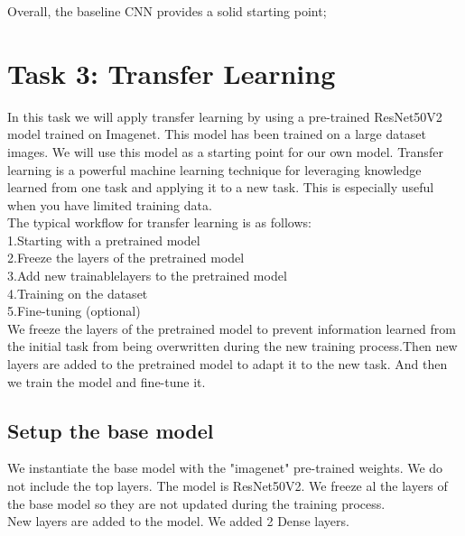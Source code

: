 \documentclass[conference]{IEEEtran}
\begin{document}
Overall, the baseline CNN provides a solid starting point;




\section{Task 3: Transfer Learning} \label{sec:task_3}
In this task we will apply transfer learning by using a pre-trained ResNet50V2 model trained on Imagenet. This model has been trained on a large dataset images. We will use this model as a starting point for our own model. Transfer learning is a powerful machine learning technique for leveraging knowledge learned
from one task and applying it to a new task. This is especially useful when you have limited training data. \\

The typical workflow for transfer learning is as follows: \\
1.Starting with a pretrained model\\
2.Freeze the layers of the pretrained model\\
3.Add new trainablelayers to the pretrained model\\
4.Training on the dataset\\
5.Fine-tuning (optional)\\

We freeze the layers of the pretrained model to prevent information learned from the initial task from being overwritten during the new training process.Then new layers are added to the pretrained model to adapt it to the new task. And then we train the model and fine-tune it.\\

\subsection{Setup the base model}
We instantiate the base model with the "imagenet" pre-trained weights. We do not include the top layers. The model is ResNet50V2. We freeze al the layers of the base model so they are not updated during the training process.\\

New layers are added to the model. We added 2 Dense layers.\\
\end{document}
